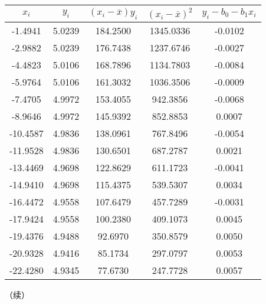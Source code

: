 \documentclass[12pt,a4paper,oneside,left=3.18,right=3.18,top=2.54,bottom=2.54]{ctexart}
\begin{document}
			\begin{table}[H]
			\centering
			\begin{tabular}{|c|c|c|c||c|}
			\hline
			$x_i$&$y_i$&$(x_i-\overline{x})y_i$&$(x_i-\overline{x})^2$&$y_i-b_0-b_1x_i$\\
			\hline
			-1.4941&5.0239&184.2500&1345.0336&-0.0102\\
			\hline
			-2.9882&5.0239&176.7438&1237.6746&-0.0027\\
			\hline
			-4.4823&5.0106&168.7896&1134.7803&-0.0084\\
			\hline
			-5.9764&5.0106&161.3032&1036.3506&-0.0009\\
			\hline
			-7.4705&4.9972&153.4055&942.3856&-0.0068\\
			\hline
			-8.9646&4.9972&145.9392&852.8853&0.0007\\
			\hline
			-10.4587&4.9836&138.0961&767.8496&-0.0054\\
			\hline
			-11.9528&4.9836&130.6501&687.2787&0.0021\\
			\hline
			-13.4469&4.9698&122.8629&611.1723&-0.0041\\
			\hline
			-14.9410&4.9698&115.4375&539.5307&0.0034\\
			\hline
			-16.4472&4.9558&107.6479&457.7289&-0.0031\\
			\hline
			-17.9424&4.9558&100.2380&409.1073&0.0045\\
			\hline
			-19.4376&4.9488&92.6970&350.8579&0.0050\\
			\hline
			-20.9328&4.9416&85.1734&297.0797&0.0053\\
			\hline
			-22.4280&4.9345&77.6730&247.7728&0.0057\\
			\hline
			\end{tabular}
			\end{table}
			（续）
\end{document}
